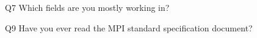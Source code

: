 \begin{description}%
\item{Q7} Which fields are you mostly working in?%
\item{Q9} Have you ever read the MPI standard specification document?%
\end{description}%

